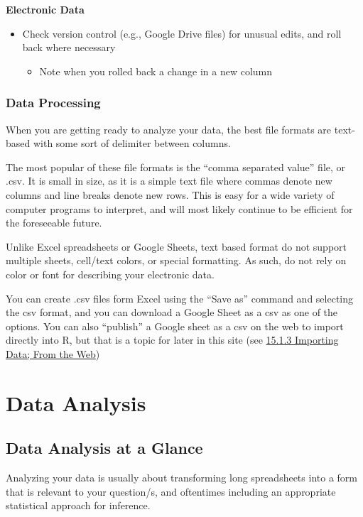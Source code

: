 \documentclass[
  letterpaper,
  DIV=11,
  numbers=noendperiod]{scrreprt}
\providecommand{\tightlist}{%
  \setlength{\itemsep}{0pt}\setlength{\parskip}{0pt}}\usepackage{longtable,booktabs,array}
\begin{document}
\textbf{Electronic Data}

\begin{itemize}
\item
  Check version control (e.g., Google Drive files) for unusual edits,
  and roll back where necessary

  \begin{itemize}
  \tightlist
  \item
    Note when you rolled back a change in a new column
  \end{itemize}
\end{itemize}

\section{Data Processing}\label{data-processing}

When you are getting ready to analyze your data, the best file formats
are text-based with some sort of delimiter between columns.

The most popular of these file formats is the ``comma separated value''
file, or .csv. It is small in size, as it is a simple text file where
commas denote new columns and line breaks denote new rows. This is easy
for a wide variety of computer programs to interpret, and will most
likely continue to be efficient for the foreseeable future.

Unlike Excel spreadsheets or Google Sheets, text based format do not
support multiple sheets, cell/text colors, or special formatting. As
such, do not rely on color or font for describing your electronic data.

You can create .csv files form Excel using the ``Save as'' command and
selecting the csv format, and you can download a Google Sheet as a csv
as one of the options. You can also ``publish'' a Google sheet as a csv
on the web to import directly into R, but that is a topic for later in
this site (see \hyperref[sec-web_import]{15.1.3 Importing Data; From the
Web})

\part{Data Analysis}

\chapter{Data Analysis at a Glance}\label{data-analysis-at-a-glance}

Analyzing your data is usually about transforming long spreadsheets into
a form that is relevant to your question/s, and oftentimes including an
appropriate statistical approach for inference.
\end{document}
